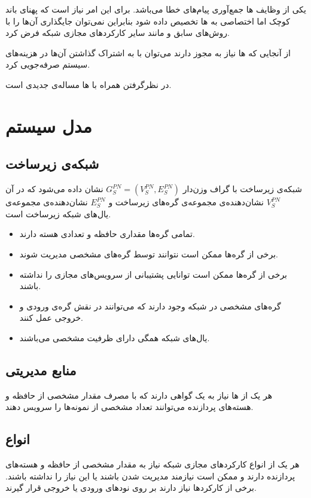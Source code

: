 یکی از وظایف ها جمع‌آوری پیام‌های خطا می‌باشد.
برای این امر نیاز است که پهنای باند کوچک اما اختصاصی به ها
تخصیص داده شود بنابراین نمی‌توان جایگذاری آن‌ها را با روش‌های سابق و مانند سایر
کارکردهای مجازی شبکه فرض کرد.

از آنجایی که ها نیاز به مجوز دارند می‌توان با به اشتراک گذاشتن آن‌ها در هزینه‌های سیستم صرفه‌جویی کرد.

در نظرگرفتن  همراه با ها مساله‌ی جدیدی است.

\section{مدل سیستم}
\subsection{شبکه‌ی زیرساخت}
شبکه‌ی زیرساخت با گراف وزن‌دار
\(G_S^{PN} = (V_S^{PN}, E_S^{PN})\)
نشان داده می‌شود
که در آن
\(V_S^{PN}\)
نشان‌دهنده‌ی مجموعه‌ی گره‌های زیرساخت
و
\(E_S^{PN}\)
نشان‌دهنده‌ی مجموعه‌ی یال‌های شبکه زیرساخت
است.

\begin{itemize}
    \item تمامی گره‌ها مقداری حافظه و تعدادی هسته دارند.
    \item برخی از گره‌ها ممکن است نتوانند توسط گره‌های مشخصی مدیریت شوند.
    \item برخی از گره‌ها ممکن است توانایی پشتیبانی از سرویس‌های مجازی را نداشته باشند.
    \item گره‌های مشخصی در شبکه وجود دارند که می‌توانند در نقش گره‌ی ورودی و خروجی عمل کنند.
    \item یال‌های شبکه همگی دارای ظرفیت مشخصی می‌باشند.
\end{itemize}

\subsection{منابع مدیریتی}
هر یک از
‌ها
نیاز به یک گواهی دارند که با مصرف مقدار مشخصی از حافظه و هسته‌های پردازنده
می‌توانند تعداد مشخصی از نمونه‌ها را سرویس دهند.

\subsection{انواع}
هر یک از انواع کارکردهای مجازی شبکه
نیاز به مقدار مشخصی از حافظه و هسته‌های پردازنده دارند
و ممکن است نیازمند مدیریت شدن باشند یا این نیاز را نداشته باشند.
برخی از کارکردها نیاز دارند بر روی نودهای ورودی یا خروجی قرار گیرند.

